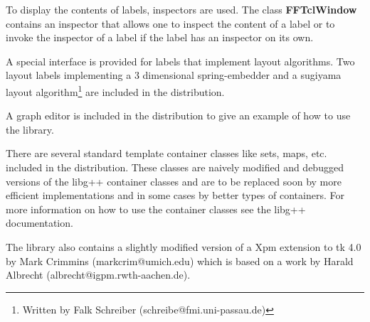 To display the contents of labels, inspectors are used. The class {\bf
FFTclWindow} contains an inspector that allows one to inspect the
content of a label or to invoke the inspector of a label if the label
has an inspector on its own.

A special interface is provided for labels that implement layout
algorithms. Two layout labels implementing a 3 dimensional
spring-embedder and a sugiyama layout algorithm\footnote{Written by Falk
Schreiber (schreibe{@}fmi.uni-passau.de)} are included in the
distribution.

A graph editor is included in the distribution to give an example
of how to use the library.

There are several standard template container classes like sets,
maps, etc. included in the distribution. These classes are naively
modified and debugged versions of the libg++ container classes
and are to be replaced soon by more efficient implementations and in some
cases by better types of containers. For more information on how
to use the container classes see the libg++ documentation.

The library also contains a slightly modified version of a Xpm
extension to tk 4.0 by Mark Crimmins (markcrim{@}umich.edu) which
is based on a work by Harald Albrecht
(albrecht{@}igpm.rwth-aachen.de).

\newpage
